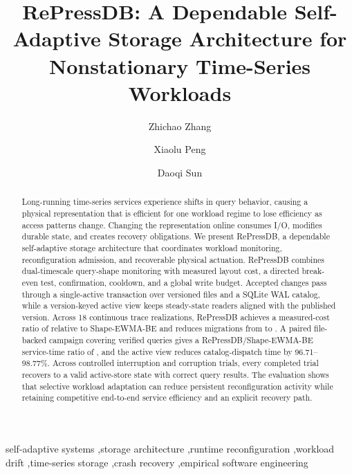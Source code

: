 \documentclass[final,5p,times,twocolumn,authoryear]{elsarticle}
\begin{document}
\begin{frontmatter}

\title{RePressDB: A Dependable Self-Adaptive Storage Architecture for Nonstationary Time-Series Workloads}

\author[aff1]{Zhichao Zhang}
\author[aff2]{Xiaolu Peng}
\author[aff1]{Daoqi Sun}
\address[aff1]{School of Science, Minzu University of China, No. 27 Zhongguancun South Avenue, Beijing, 100081, China}
\address[aff2]{School of Navigation, Dalian Maritime University, No. 1 Linghai Road, Ganjingzi District, Dalian 116026, China}

\begin{abstract}
Long-running time-series services experience shifts in query behavior, causing a physical representation that is efficient for one workload regime to lose efficiency as access patterns change. Changing the representation online consumes I/O, modifies durable state, and creates recovery obligations. We present RePressDB, a dependable self-adaptive storage architecture that coordinates workload monitoring, reconfiguration admission, and recoverable physical actuation. RePressDB combines dual-timescale query-shape monitoring with measured layout cost, a directed break-even test, confirmation, cooldown, and a global write budget. Accepted changes pass through a single-active transaction over versioned files and a SQLite WAL catalog, while a version-keyed active view keeps steady-state readers aligned with the published version. Across 18 continuous trace realizations, RePressDB achieves a measured-cost ratio of \ReplayRepressShapeRatio{} relative to Shape-EWMA-BE and reduces migrations from \ReplayShapeMigrations{} to \ReplayRepressMigrations. A paired file-backed campaign covering \EndToEndQueries{} verified queries gives a RePressDB/Shape-EWMA-BE service-time ratio of \EndToEndRepressShapeRatio, and the active view reduces catalog-dispatch time by 96.71--98.77\%. Across \CombinedRecoveryTrials{} controlled interruption and corruption trials, every completed trial recovers to a valid active-store state with correct query results. The evaluation shows that selective workload adaptation can reduce persistent reconfiguration activity while retaining competitive end-to-end service efficiency and an explicit recovery path.
\end{abstract}

\begin{keyword}
self-adaptive systems \sep storage architecture \sep runtime reconfiguration \sep workload drift \sep time-series storage \sep crash recovery \sep empirical software engineering
\end{keyword}

\end{frontmatter}
\end{document}
